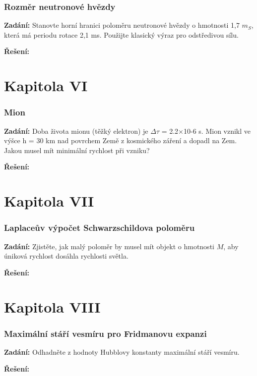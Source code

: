 \documentclass{article}
\begin{document}
\section*{Rozměr neutronové hvězdy}
\textbf{Zadání:}  Stanovte horní hranici poloměru neutronové hvězdy o hmotnosti 1,7 $m_S$, která má
periodu rotace 2,1 ms. Použijte klasický výraz pro odstředivou sílu.

\textbf{Řešení:}

\part*{Kapitola \textrm{V\hspace{-.1em}I}}

\section*{Mion}
\textbf{Zadání:}  Doba života mionu (těžký elektron) je $\Delta \tau$ = 2.2×10-6 s. Mion vznikl ve výšce h = 30 km
nad povrchem Země z kosmického záření a dopadl na Zem. Jakou musel mít minimální rychlost
při vzniku?

\textbf{Řešení:}

\part*{Kapitola \textrm{V\hspace{-.1em}I\hspace{-.1em}I}}

\section*{Laplaceův výpočet Schwarzschildova poloměru}
\textbf{Zadání:}  Zjistěte, jak malý poloměr by musel mít objekt o hmotnosti $M$, aby úniková rychlost
dosáhla rychlosti světla.

\textbf{Řešení:}

\part*{Kapitola \textrm{V\hspace{-.1em}I\hspace{-.1em}I\hspace{-.1em}I}}

\section*{Maximální stáří vesmíru pro Fridmanovu expanzi}
\textbf{Zadání:}  Odhadněte z hodnoty Hubblovy konstanty maximální stáří vesmíru.

\textbf{Řešení:}
\end{document}
